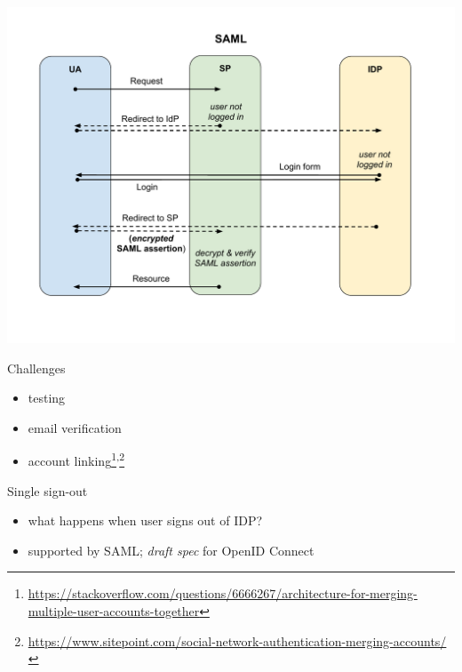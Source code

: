 \documentclass[ignorenonframetext,aspectratio=169]{beamer}
\providecommand{\tightlist}{%
  \setlength{\itemsep}{0pt}\setlength{\parskip}{0pt}}
\begin{document}
\begin{frame}[plain]
\centering
\includegraphics[height=\paperheight]{fedsso-security-saml.pdf}
\end{frame}

\begin{frame}{Challenges}

\begin{itemize}
\tightlist
\item testing
\item email verification
\item account linking\footnote{
        \url{https://stackoverflow.com/questions/6666267/architecture-for-merging-multiple-user-accounts-together}
    }\textsuperscript{,}\footnote{
        \url{https://www.sitepoint.com/social-network-authentication-merging-accounts/}
    }
\end{itemize}
\end{frame}

\begin{frame}{Single sign-out}
\begin{itemize}
\tightlist
\item what happens when user signs out of IDP?
\item supported by SAML; {\em draft spec} for OpenID Connect
\end{itemize}
\end{frame}
\end{document}
